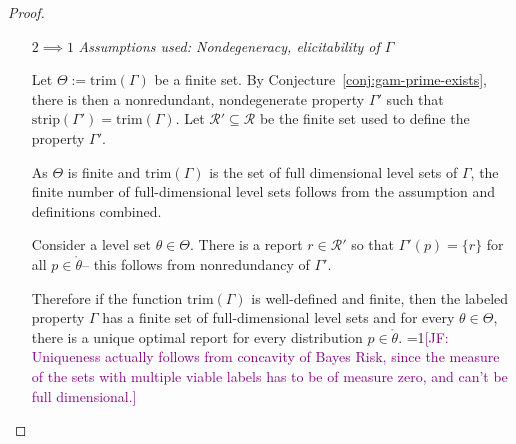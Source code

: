 \documentclass[12pt]{article}
\newcommand{\Comments}{1}
\newcommand{\mynote}[2]{\ifnum\Comments=1\textcolor{#1}{#2}\fi}
\newcommand{\jessie}[1]{\mynote{purple}{[JF: #1]}}
\newcommand{\E}{\mathbb{E}}
\newcommand{\R}{\mathcal{R}}
\newcommand{\inter}[1]{\mathring{#1}}%
\newcommand{\trim}{\mathrm{trim}}
\newcommand{\strip}{\text{strip}}
\DeclareMathOperator*{\argmin}{arg\,min}
\begin{document}
\begin{proof}
\begin{enumerate}
%
%
%



\item[$2 \implies 1$]  
\emph{Assumptions used: Nondegeneracy, elicitability of $\Gamma$}

Let $\Theta := \trim(\Gamma)$ be a finite set.
By Conjecture~\ref{conj:gam-prime-exists}, there is then a nonredundant, nondegenerate property $\Gamma'$ such that $\strip(\Gamma') = \trim(\Gamma)$.
Let $\R' \subseteq \R$ be the finite set used to define the property $\Gamma'$.

As $\Theta$ is finite and $\trim(\Gamma)$ is the set of full dimensional level sets of $\Gamma$, the finite number of full-dimensional level sets follows from the assumption and definitions combined.

Consider a level set $\theta\in \Theta$.
There is a report $r \in \R'$ so that $\Gamma'(p) = \{r\}$ for all $p \in \inter{\theta}$-- this follows from nonredundancy of $\Gamma'$.

Therefore if the function $\trim(\Gamma)$ is well-defined and finite, then the labeled property $\Gamma$ has a finite set of full-dimensional level sets and for every $\theta \in \Theta$, there is a unique optimal report for every distribution $p \in \inter{\theta}$.
\jessie{Uniqueness actually follows from concavity of Bayes Risk, since the measure of the sets with multiple viable labels has to be of measure zero, and can't be full dimensional.}



\end{enumerate}
\end{proof}
\end{document}
